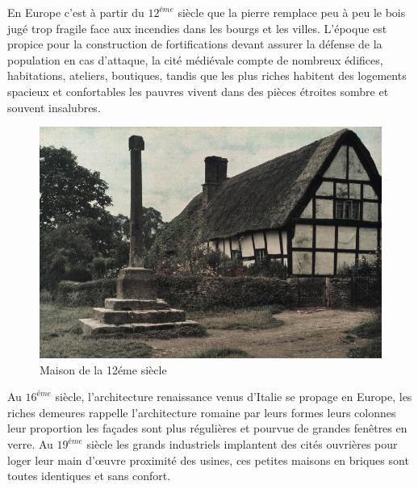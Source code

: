 En Europe c'est  à partir du $12^{éme}$ siècle que la pierre remplace peu  à  peu le bois jugé trop fragile face aux incendies dans les bourgs et les villes. L'époque est propice pour la construction de fortifications devant assurer la défense de la population en cas d'attaque, la cité médiévale compte de nombreux édifices, habitations, ateliers, boutiques, tandis que les plus riches habitent des logements spacieux et confortables les pauvres vivent dans des pièces étroites sombre et souvent insalubres.


\begin{figure}[H]
    \centering
    \includegraphics[scale=1.2]{chap1/chap36.jpg}
   \caption{Maison de la 12éme siècle}
    \label{chap36}
\end{figure}

Au $16^{éme}$ siècle, l’architecture renaissance venus d’Italie se propage en Europe, les riches demeures rappelle l'architecture romaine par leurs formes leurs colonnes leur proportion les façades sont plus régulières et pourvue de grandes fenêtres en verre. Au $19^{éme}$ siècle les grands industriels implantent des cités ouvrières pour loger leur main d'œuvre proximité des usines, ces petites maisons en briques sont toutes identiques et sans confort.

